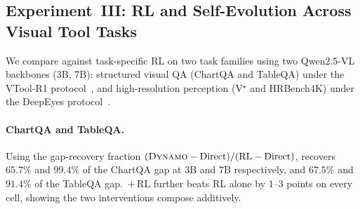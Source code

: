 \begin{table}[t]
\centering
\small
\setlength{\tabcolsep}{4pt}
\renewcommand{\arraystretch}{1.15}
\caption{%
  \textbf{Controlled tool-policy analysis on GTA.}
  Acc.\ and Tool use in \%; Avg.\ calls is a count.
}
\label{tab:gta_controlled}
\end{table}



\subsection{Experiment~III: RL and Self-Evolution Across Visual Tool Tasks}
\label{sec:exp3}

We compare \sysname{} against task-specific RL on two task families using two
Qwen2.5-VL backbones (3B, 7B): structured visual QA (ChartQA and TableQA) under
the VTool-R1 protocol~\citep{DBLP:journals/corr/abs-2505-19255}, and high-resolution
perception (V$^\star$ and HRBench4K) under the DeepEyes
protocol~\citep{DBLP:journals/corr/abs-2505-14362}.

\paragraph{ChartQA and TableQA.}
Using the gap-recovery fraction $(\textsc{Dynamo}{}-\text{Direct})/(\text{RL}-\text{Direct})$,
\sysname{} recovers $65.7\%$ and $99.4\%$ of the ChartQA gap at 3B and 7B respectively,
and $67.5\%$ and $91.4\%$ of the TableQA gap. \sysname{}\,$+$\,RL further beats RL alone
by $1$--$3$ points on every cell, showing the two interventions compose additively.

